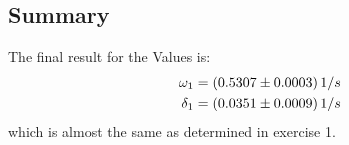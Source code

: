 \subsection{Summary}
The final result for the Values is:
\begin{align}
\omega_1 &= (0.5307 \pm 0.0003) \, 1/s \notag \\
\delta_1 &= (0.0351 \pm 0.0009) \, 1/s \notag
\end{align}
which is almost the same as determined in exercise 1.
